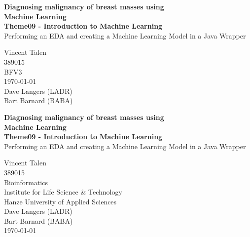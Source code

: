 

\begin{center}
  \topskip=45pt
  \LARGE{\textbf{Diagnosing malignancy of breast masses using\\Machine Learning}}\\
  \vspace*{20pt}
  \large{\textbf{Theme09 - Introduction to Machine Learning}}\\
  \large{Performing an EDA and creating a Machine Learning Model in a Java Wrapper}\\
  \vspace*{40pt}
\end{center}
\vspace*{\fill}
\begin{flushright}
  Vincent Talen\\
  389015\\
  BFV3\\
  \today\\
  Dave Langers (LADR)\\
  Bart Barnard (BABA)\\
\end{flushright}


\newpage
\null


\newpage
\begin{center}
  \topskip=45pt
  \LARGE{\textbf{Diagnosing malignancy of breast masses using\\Machine Learning}}\\
  \vspace*{20pt}
  \large{\textbf{Theme09 - Introduction to Machine Learning}}\\
  \large{Performing an EDA and creating a Machine Learning Model in a Java Wrapper}\\
\end{center}
\vspace*{\fill}
\begin{flushright}
  Vincent Talen\\
  389015\\
  Bioinformatics\\
  Institute for Life Science \& Technology\\
  Hanze University of Applied Sciences\\
  Dave Langers (LADR)\\
  Bart Barnard (BABA)\\
  \today\\
\end{flushright}


